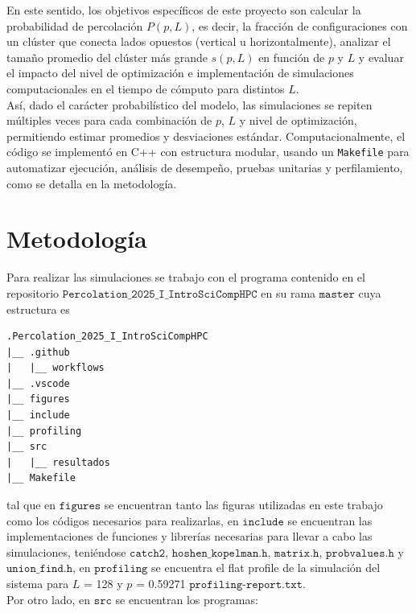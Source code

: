 \documentclass[12pt,a4paper]{article}
\begin{document}
En este sentido, los objetivos específicos de este proyecto son calcular la probabilidad de percolación \( P(p, L) \), es decir, la fracción de configuraciones con un clúster que conecta lados opuestos (vertical u horizontalmente), analizar el tamaño promedio del clúster más grande \( s(p, L) \) en función de \( p \) y \( L \) y evaluar el impacto del nivel de optimización e implementación de simulaciones computacionales en el tiempo de cómputo para distintos \( L \).
\\

Así, dado el carácter probabilístico del modelo, las simulaciones se repiten múltiples veces para cada combinación de \( p \), \( L \) y nivel de optimización, permitiendo estimar promedios y desviaciones estándar. Computacionalmente, el código se implementó en C++ con estructura modular, usando un \texttt{Makefile} para automatizar ejecución, análisis de desempeño, pruebas unitarias y perfilamiento, como se detalla en la metodología.


\section{Metodología}
Para realizar las simulaciones se trabajo con el programa contenido en el repositorio $\texttt{Percolation\_2025\_I\_IntroSciCompHPC}$ \cite{Mayorga2024} en su rama $\texttt{master}$ cuya estructura es 

\begin{verbatim}
.Percolation_2025_I_IntroSciCompHPC
|__ .github
|   |__ workflows
|__ .vscode
|__ figures
|__ include
|__ profiling
|__ src
|   |__ resultados
|__ Makefile
\end{verbatim}

tal que en $\texttt{figures}$ se encuentran tanto las figuras utilizadas en este trabajo como los códigos necesarios para realizarlas, en $\texttt{include}$ se encuentran las implementaciones de funciones y librerías necesarias para llevar a cabo las simulaciones, teniéndose $\texttt{catch2}$, $\texttt{hoshen\_kopelman.h}$, $\texttt{matrix.h}$, $\texttt{probvalues.h}$ y $\texttt{union\_find.h}$, en $\texttt{profiling}$ se encuentra el flat profile de la simulación del sistema para $L$ = 128 y $p$ = 0.59271 $\texttt{profiling-report.txt}$.
\\

Por otro lado, en $\texttt{src}$ se encuentran los programas:
\end{document}
